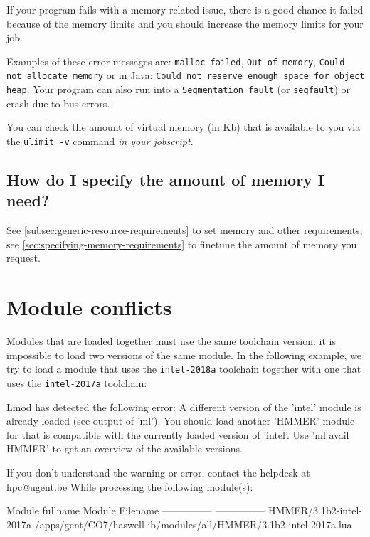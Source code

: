 If your program fails with a memory-related issue, there is a good chance it failed
because of the memory limits and you should increase the memory limits for your job.

Examples of these error messages are: \verb|malloc failed|, \verb|Out of memory|,
\verb|Could not allocate memory|
or in Java: \verb|Could not reserve enough space for object heap|. Your program can
also run into a \verb|Segmentation fault| (or \verb|segfault|) or crash due to bus errors.

You can check the amount of virtual memory (in Kb) that is available to you via the
\verb|ulimit -v| command \emph{in your jobscript}.

\subsection{How do I specify the amount of memory I need?}

See \autoref{subsec:generic-resource-requirements} to set memory and other requirements,
see \autoref{sec:specifying-memory-requirements} to finetune the amount of memory you request.

\ifgent

\section{Module conflicts}

Modules that are loaded together must use the same toolchain version:
it is impossible to load two versions of the same module. In the following
example, we try to load a module that uses the \verb|intel-2018a| toolchain
together with one that uses the \verb|intel-2017a| toolchain:

\begin{prompt}
Lmod has detected the following error:  A different version of the 'intel' module is already loaded (see output of 'ml').
You should load another 'HMMER' module for that is compatible with the currently loaded version of 'intel'.
Use 'ml avail HMMER' to get an overview of the available versions.

If you don't understand the warning or error, contact the helpdesk at hpc@ugent.be
While processing the following module(s):

    Module fullname          Module Filename
    ---------------          ---------------
    HMMER/3.1b2-intel-2017a  /apps/gent/CO7/haswell-ib/modules/all/HMMER/3.1b2-intel-2017a.lua
\end{prompt}


